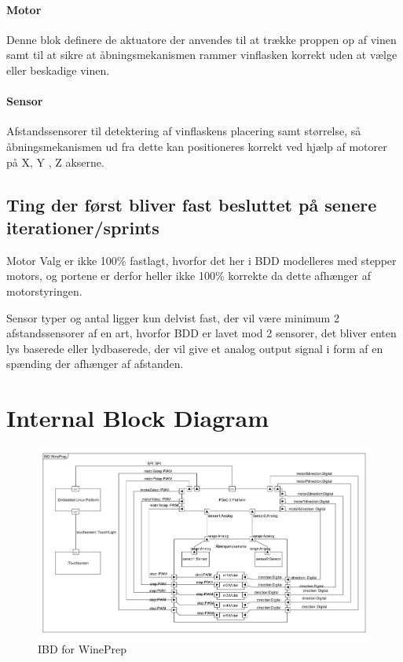 \paragraph{Motor} Denne blok definere de aktuatore der anvendes til at trække proppen op af vinen samt til at sikre at åbningsmekanismen rammer vinflasken korrekt uden at vælge eller beskadige vinen.

\paragraph{Sensor} Afstandssensorer til detektering af vinflaskens placering samt størrelse, så åbningsmekanismen ud fra dette kan positioneres korrekt ved hjælp af motorer på X, Y , Z akserne.

\subsection{Ting der først bliver fast besluttet på senere iterationer/sprints}

Motor Valg er ikke 100\% fastlagt, hvorfor det her i BDD modelleres med stepper motors, og portene er derfor heller ikke 100\% korrekte da dette afhænger af motorstyringen.

Sensor typer og antal ligger kun delvist fast, der vil være minimum 2 afstandssensorer af en art, hvorfor BDD er lavet mod 2 sensorer, det bliver enten lys baserede eller lydbaserede, der vil give et analog output signal i form af en spænding der afhænger af afstanden.

\section{Internal Block Diagram}

\begin{figure}[H]
	\centering
	\includegraphics[scale=0.3]{IBDiagram}
	\caption{IBD for WinePrep}
	\label{IBD}
\end{figure}

